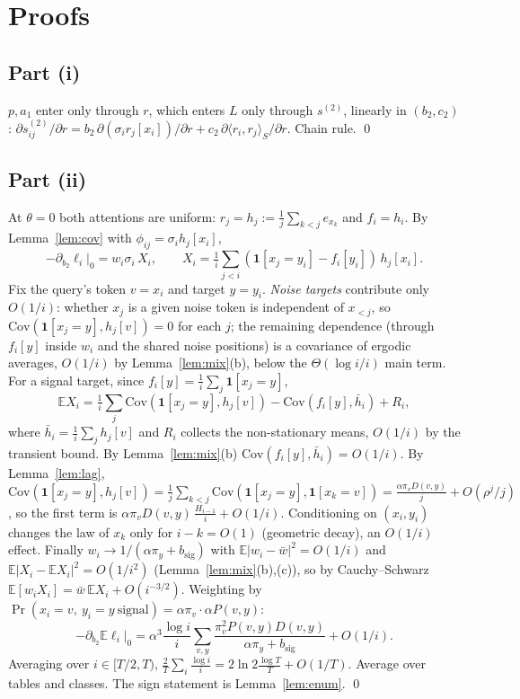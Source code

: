 \documentclass[11pt]{article}
\theoremstyle{definition}\newtheorem{assumption}{Assumption}\newtheorem{definition}{Definition}
\theoremstyle{remark}\newtheorem{remark}{Remark}
\newcommand{\1}{\mathbf{1}}\newcommand{\E}{\mathbb E}
\begin{document}
\section{Proofs}
\subsection{Part (i)}
$p,a_1$ enter only through $r$, which enters $L$ only through $s^{(2)}$, linearly in $(b_2,c_2)$:
$\partial s^{(2)}_{ij}/\partial r=b_2\,\partial(\sigma_ir_j[x_i])/\partial r+c_2\,\partial\langle r_i,r_j\rangle_S/\partial r$. Chain rule. \qed

\subsection{Part (ii)}
At $\theta=0$ both attentions are uniform: $r_j=h_j:=\frac1j\sum_{k<j}e_{x_k}$ and $f_i=h_i$. By Lemma~\ref{lem:cov}
with $\phi_{ij}=\sigma_ih_j[x_i]$,
\[
-\partial_{b_2}\ell_i|_0=w_i\sigma_i\,X_i,\qquad X_i=\tfrac1i\textstyle\sum_{j<i}(\1[x_j=y_i]-f_i[y_i])\,h_j[x_i].
\]
Fix the query's token $v=x_i$ and target $y=y_i$. \emph{Noise targets} contribute only $O(1/i)$: whether
$x_j$ is a given noise token is independent of $x_{<j}$, so $\mathrm{Cov}(\1[x_j=y],h_j[v])=0$ for each $j$; the
remaining dependence (through $f_i[y]$ inside $w_i$ and the shared noise positions) is a covariance of
ergodic averages, $O(1/i)$ by Lemma~\ref{lem:mix}(b), below the $\Theta(\log i/i)$ main term.
For a signal target, since $f_i[y]=\frac1i\sum_j\1[x_j=y]$,
\[
\E X_i=\tfrac1i\textstyle\sum_j\mathrm{Cov}(\1[x_j=y],h_j[v])-\mathrm{Cov}(f_i[y],\bar h_i)+R_i,
\]
where $\bar h_i=\frac1i\sum_jh_j[v]$ and $R_i$ collects the non-stationary means, $O(1/i)$ by the transient
bound. By Lemma~\ref{lem:mix}(b) $\mathrm{Cov}(f_i[y],\bar h_i)=O(1/i)$. By Lemma~\ref{lem:lag},
$\mathrm{Cov}(\1[x_j=y],h_j[v])=\frac1j\sum_{k<j}\mathrm{Cov}(\1[x_j=y],\1[x_k=v])=\frac{\alpha\pi_vD(v,y)}j+O(\rho^j/j)$,
so the first term is $\alpha\pi_vD(v,y)\,\frac{H_{i-1}}i+O(1/i)$. Conditioning on $(x_i,y_i)$ changes the law of
$x_k$ only for $i-k=O(1)$ (geometric decay), an $O(1/i)$ effect. Finally $w_i\to1/(\alpha\pi_y+b_{\mathrm{sig}})$ with
$\E|w_i-\bar w|^2=O(1/i)$ and $\E|X_i-\E X_i|^2=O(1/i^2)$ (Lemma~\ref{lem:mix}(b),(c)), so by Cauchy--Schwarz
$\E[w_iX_i]=\bar w\,\E X_i+O(i^{-3/2})$. Weighting by $\Pr(x_i=v,\ y_i=y\ \text{signal})=\alpha\pi_v\cdot\alpha P(v,y)$:
\[
-\partial_{b_2}\E\ell_i|_0=\alpha^3\frac{\log i}{i}\sum_{v,y}\frac{\pi_v^2P(v,y)D(v,y)}{\alpha\pi_y+b_{\mathrm{sig}}}+O(1/i).
\]
Averaging over $i\in[T/2,T)$, $\frac2T\sum_i\frac{\log i}{i}=2\ln2\frac{\log T}T+O(1/T)$. Average over tables and
classes. The sign statement is Lemma~\ref{lem:enum}. \qed
\end{document}

